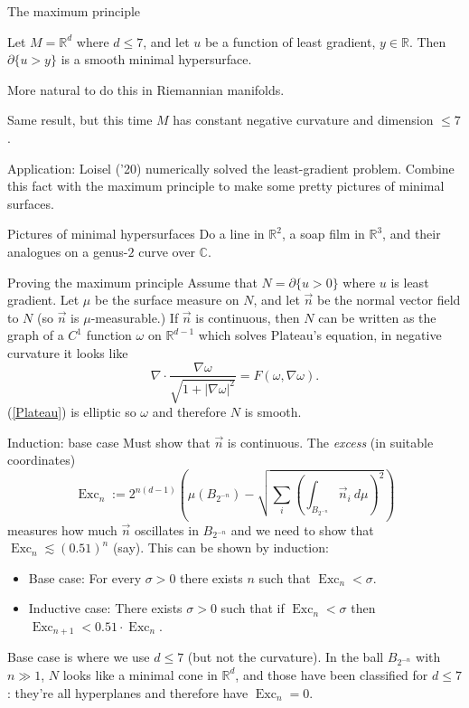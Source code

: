 \documentclass[10pt]{beamer}
\newcommand{\RR}{\mathbb{R}}
\newcommand{\CC}{\mathbb{C}}
\DeclareMathOperator{\Exc}{Exc}
\newcommand{\normal}{\vec n}
\begin{document}
\begin{frame}{The maximum principle}
\begin{theorem}
Let $M = \RR^d$ where $d \leq 7$, and let $u$ be a function of least gradient, $y \in \RR$. Then $\partial \{u > y\}$ is a smooth minimal hypersurface.
\end{theorem}
\pause
More natural to do this in Riemannian manifolds.
\begin{theorem}[B. '22]
Same result, but this time $M$ has constant negative curvature and dimension $\leq 7$.
\end{theorem}
\pause
Application: Loisel ('20) numerically solved the least-gradient problem. Combine this fact with the maximum principle to make some pretty pictures of minimal surfaces.
\end{frame}

\begin{frame}{Pictures of minimal hypersurfaces}
Do a line in $\RR^2$, a soap film in $\RR^3$, and their analogues on a genus-$2$ curve over $\CC$.
\end{frame}

\begin{frame}{Proving the maximum principle}
Assume that $N = \partial \{u > 0\}$ where $u$ is least gradient.
Let $\mu$ be the surface measure on $N$, and let $\normal$ be the normal vector field to $N$ (so $\normal$ is $\mu$-measurable.) \pause If $\normal$ is continuous, then $N$ can be written as the graph of a $C^1$ function $\omega$ on $\RR^{d - 1}$ which solves Plateau's equation, in negative curvature it looks like
\begin{equation}\label{Plateau}
\nabla \cdot \frac{\nabla \omega}{\sqrt{1 + |\nabla \omega|^2}} = F(\omega, \nabla \omega).
\end{equation}
(\ref{Plateau}) is elliptic so $\omega$ and therefore $N$ is smooth.
\end{frame}

\begin{frame}{Induction: base case}
Must show that $\normal$ is continuous. The \emph{excess} (in suitable coordinates)
$$\Exc_n := 2^{n(d - 1)} \left(\mu(B_{2^{-n}}) - \sqrt{\sum_i\left(\int_{B_{2^{-n}}} \normal_i ~d\mu\right)^2} \right)$$
measures how much $\normal$ oscillates in $B_{2^{-n}}$ and we need to show that $\Exc_n \lesssim (0.51)^n$ (say). This can be shown by induction:\pause
\begin{itemize}
\item Base case: For every $\sigma > 0$ there exists $n$ such that $\Exc_n < \sigma$.\pause
\item Inductive case: There exists $\sigma > 0$ such that if $\Exc_n < \sigma$ then $\Exc_{n + 1} < 0.51 \cdot \Exc_n$.\pause
\end{itemize}
Base case is where we use $d \leq 7$ (but not the curvature). In the ball $B_{2^{-n}}$ with $n \gg 1$, $N$ looks like a minimal cone in $\RR^d$, and those have been classified for $d \leq 7$: they're all hyperplanes and therefore have $\Exc_n = 0$.
\end{frame}
\end{document}
